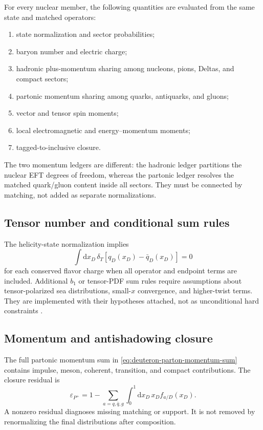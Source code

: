 \documentclass[11pt]{article}
\newcommand{\dd}{\mathrm{d}}
\newcommand{\eps}{\varepsilon}
\begin{document}
For every nuclear member, the following quantities are evaluated from the
same state and matched operators:
\begin{enumerate}
\item state normalization and sector probabilities;
\item baryon number and electric charge;
\item hadronic plus-momentum sharing among nucleons, pions, Deltas, and
      compact sectors;
\item partonic momentum sharing among quarks, antiquarks, and gluons;
\item vector and tensor spin moments;
\item local electromagnetic and energy--momentum moments;
\item tagged-to-inclusive closure.
\end{enumerate}
The two momentum ledgers are different: the hadronic ledger partitions the
nuclear EFT degrees of freedom, whereas the partonic ledger resolves the
matched quark/gluon content inside all sectors.  They must be connected by
matching, not added as separate normalizations.

\subsection{Tensor number and conditional sum rules}

The helicity-state normalization implies
\begin{equation}
 \int\dd x_D\,
 \delta_T\left[q_D(x_D)-\bar q_D(x_D)\right]=0
\label{eq:tensor-valence-number}
\end{equation}
for each conserved flavor charge when all operator and endpoint terms are
included.  Additional \(b_1\) or tensor-PDF sum rules require assumptions
about tensor-polarized sea distributions, small-\(x\) convergence, and
higher-twist terms.  They are implemented with their hypotheses attached,
not as unconditional hard constraints
\cite{Kumano2014,KumanoSong2021}.

\subsection{Momentum and antishadowing closure}

The full partonic momentum sum in \cref{eq:deuteron-parton-momentum-sum}
contains impulse, meson, coherent, transition, and compact contributions.
The closure residual is
\begin{equation}
 \eps_{P^+}
 =1-
 \sum_{a=q,\bar q,g}
 \int_0^1\dd x_D\,x_D f_{a/D}(x_D).
\label{eq:momentum-closure-residual}
\end{equation}
A nonzero residual diagnoses missing matching or support.  It is not removed
by renormalizing the final distributions after composition.
\end{document}
